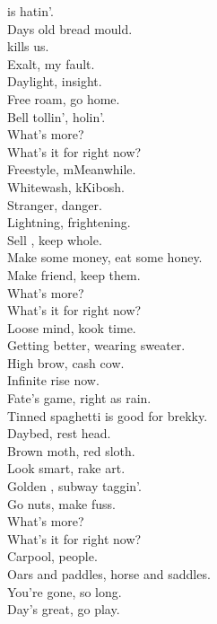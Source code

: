  is hatin'. \\
Days old bread mould. \\
 kills us. \\
Exalt, my fault. \\

Daylight, insight. \\
Free roam, go home. \\
Bell tollin',  holin'. \\

What's more? \\
What's it for right now? \\

Freestyle, mMeanwhile. \\
Whitewash, kKibosh. \\
Stranger, danger. \\
Lightning, frightening. \\

Sell , keep whole. \\
Make some money, eat some honey. \\
Make friend, keep them. \\

What's more? \\
What's it for right now? \\

Loose mind, kook time. \\
Getting better, wearing sweater. \\
High brow, cash cow. \\
Infinite rise now. \\

Fate's game, right as rain. \\
Tinned spaghetti is good for brekky. \\
Daybed, rest head. \\
Brown moth, red sloth. \\

Look smart, rake art. \\
Golden , subway taggin'. \\
Go nuts, make fuss. \\

What's more? \\
What's it for right now? \\

Carpool, people. \\
Oars and paddles, horse and saddles. \\
You're gone, so long. \\
Day's great, go play. \\

